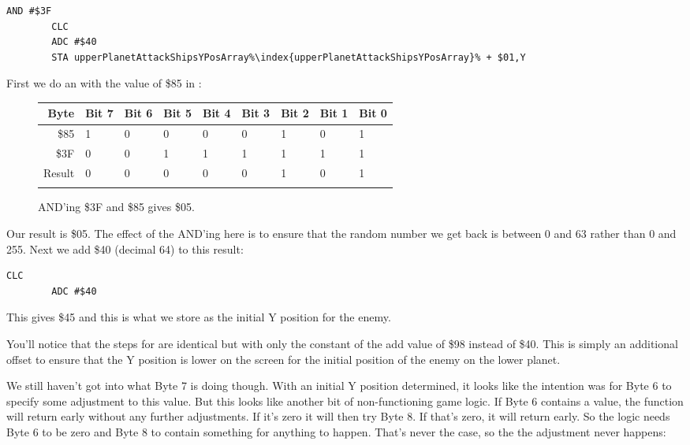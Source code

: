 \begin{lstlisting}[escapechar=\%]
        AND #$3F
        CLC
        ADC #$40
        STA upperPlanetAttackShipsYPosArray%\index{upperPlanetAttackShipsYPosArray}% + $01,Y
\end{lstlisting}

First we do an  with the value of \$85 in :
\begin{figure}[H]
  {
    \setlength{\tabcolsep}{3.0pt}
    \setlength\cmidrulewidth{\heavyrulewidth} %
    \begin{adjustbox}{width=7cm,center}

      \begin{tabular}{rllllllll}
        \toprule
        Byte & Bit 7 & Bit 6 & Bit 5 & Bit 4 & Bit 3 & Bit 2 & Bit 1 & Bit 0        \\
        \midrule
        \$85 & 1 & 0 & 0 & 0 & 0 & 1 & 0 & 1 \\
        \$3F & 0 & 0 & 1 & 1 & 1 & 1 & 1 & 1 \\
        \midrule
        Result & 0 & 0 & 0 & 0 & 0 & 1 & 0 & 1 \\
        \addlinespace
        \bottomrule
      \end{tabular}

    \end{adjustbox}

    }\caption*{AND'ing \$3F and \$85 gives \$05.}
\end{figure}

Our result is \$05. The effect of the AND'ing here is to ensure that the random number we get back is between 0 and 63 rather
than 0 and 255. Next we add \$40 (decimal 64) to this result:

\begin{lstlisting}[escapechar=\%]
        CLC
        ADC #$40
\end{lstlisting}

This gives \$45 and this is what we store as the initial Y position for the enemy.

You'll notice that the steps for  are identical but with only the constant of the
add value of \$98 instead of \$40. This is simply an additional offset to ensure that the Y position is lower on the screen
for the initial position of the enemy on the lower planet.

We still haven't got into what Byte 7 is doing though. With an initial Y position determined, it looks like the intention was
for Byte 6 to specify some adjustment to this value. But this looks like another bit of non-functioning game logic. If
Byte 6 contains a value, the function will return early without any further adjustments. If it's zero it will then try
Byte 8. If that's zero, it will return early. So the logic needs Byte 6 to be zero and Byte 8 to contain something for 
anything to happen. That's never the case, so the the adjustment never happens:


